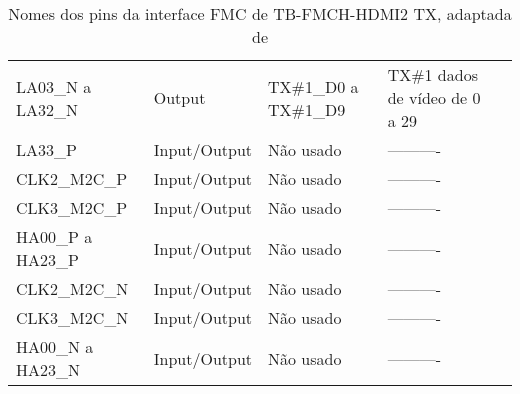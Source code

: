 \begin{table}[h!]
{\begin{tabular}{@{}lllll@{}}
			LA03\_N a LA32\_N    & Output                & TX\#1\_D0 a TX\#1\_D9  & TX\#1 dados de vídeo de 0 a 29 \\ 
			LA33\_P              & Input/Output          & Não usado              & ----------                     \\ 
			CLK2\_M2C\_P         & Input/Output          & Não usado              & ----------                     \\ 
			CLK3\_M2C\_P         & Input/Output          & Não usado              & ----------                     \\ 
			HA00\_P a HA23\_P    & Input/Output          & Não usado              & ----------                     \\ 
			CLK2\_M2C\_N         & Input/Output          & Não usado              & ----------                     \\ 
			CLK3\_M2C\_N         & Input/Output          & Não usado              & ----------                     \\ 
			HA00\_N a HA23\_N    & Input/Output          & Não usado              & ----------                     \\ \bottomrule
		\end{tabular}}
			\caption{Nomes dos pins da interface FMC de TB-FMCH-HDMI2 TX, adaptada de \cite{R009}}
			\label{table:HDMIdataTX}
	\end{table}


